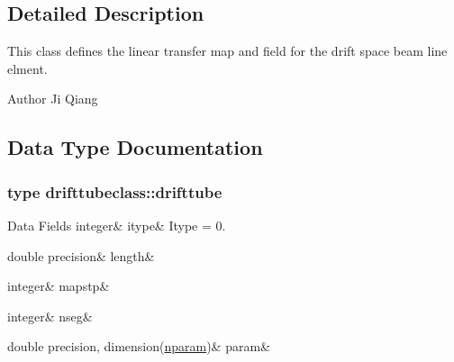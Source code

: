 \subsection{Detailed Description}
This class defines the linear transfer map and field for the drift space beam line elment. 

\begin{DoxyAuthor}{Author}
Ji Qiang 
\end{DoxyAuthor}


\subsection{Data Type Documentation}
\label{structdrifttubeclass_1_1drifttube}
\subsubsection{type drifttubeclass\+::drifttube}
\begin{DoxyFields}{Data Fields}
\mbox{\label{namespacedrifttubeclass_a1155bc20a840fce9a823eba951439db2}} 
integer&
itype&
Itype = 0. \\
\hline

\mbox{\label{namespacedrifttubeclass_afec6676520da9cf2c2dd6a8298f8577b}} 
double precision&
length&
\\
\hline

\mbox{\label{namespacedrifttubeclass_a32a529cb8bf2da679620c46a2ac0bd6d}} 
integer&
mapstp&
\\
\hline

\mbox{\label{namespacedrifttubeclass_ac9c97374879fd6cd44d8ff391152ce6f}} 
integer&
nseg&
\\
\hline

\mbox{\label{namespacedrifttubeclass_abc755647bb29543bf6f4d65f7af740d4}} 
double precision, dimension(\mbox{\hyperlink{namespacedrifttubeclass_af382d7cef81496c1d2c2bf3ba72c4350}{nparam}})&
param&
\\
\hline

\end{DoxyFields}


